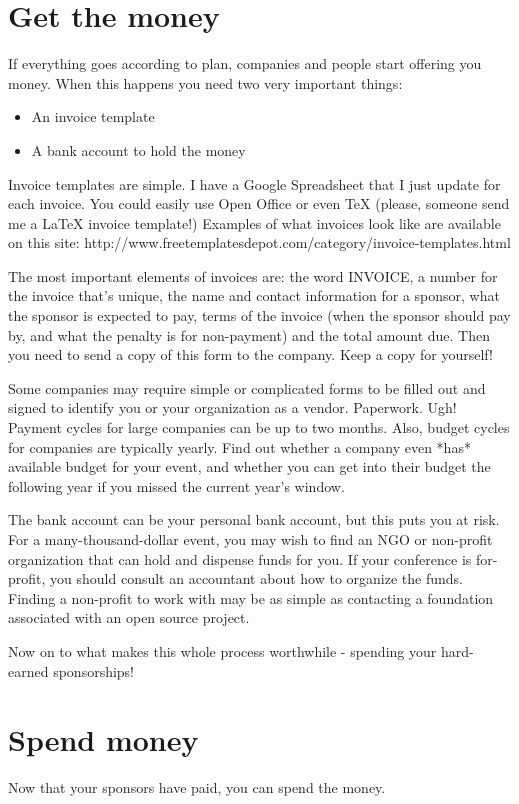\section*{Get the money}
If everything goes according to plan, companies and people start offering you money. When this happens you need two very important things: 

\begin{itemize}
\item An invoice template
\item A bank account to hold the money
\end{itemize}

Invoice templates are simple. I have a Google Spreadsheet that I just update for each invoice. You could easily use Open Office or even TeX (please, someone send me a LaTeX invoice template!) Examples of what invoices look like are available on this site: http://www.freetemplatesdepot.com/category/invoice-templates.html

The most important elements of invoices are: the word INVOICE, a number for the invoice that’s unique, the name and contact information for a sponsor, what the sponsor is expected to pay, terms of the invoice (when the sponsor should pay by, and what the penalty is for non-payment) and the total amount due. Then you need to send a copy of this form to the company. Keep a copy for yourself!

Some companies may require simple or complicated forms to be filled out and signed to identify you or your organization as a vendor. Paperwork. Ugh! Payment cycles for large companies can be up to two months. Also, budget cycles for companies are typically yearly. Find out whether a company even *has* available budget for your event, and whether you can get into their budget the following year if you missed the current year’s window.

The bank account can be your personal bank account, but this puts you at risk. For a many-thousand-dollar event, you may wish to find an NGO or non-profit organization that can hold and dispense funds for you. If your conference is for-profit, you should consult an accountant about how to organize the funds. Finding a non-profit to work with may be as simple as contacting a foundation associated with an open source project. 

Now on to what makes this whole process worthwhile - spending your hard-earned sponsorships!

\section*{Spend money}
Now that your sponsors have paid, you can spend the money. 

